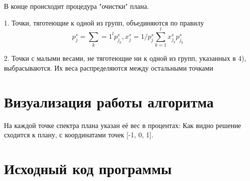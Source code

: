В конце происходит процедура "очистки" плана.

1. Точки, тяготеющие к одной из групп, объединяются по правилу
\[ p_j^s = \sum_k=1^l p_{j_k}^s, x_j^s = 1 / p_j^s \sum_{k=1}^l {x_{j_k}^s p_{j_k}^s} \]

2. Точки с малыми весами, не тяготеющие ни к одной из групп, указанных в 4), выбрасываются.
Их веса распределяются между остальными точками 





\section{Визуализация работы алгоритма}

На каждой точке спектра плана указан её вес в процентах:
Как видно решение сходится к плану, с координатами точек [-1, 0, 1].




\section{Исходный код программы}
